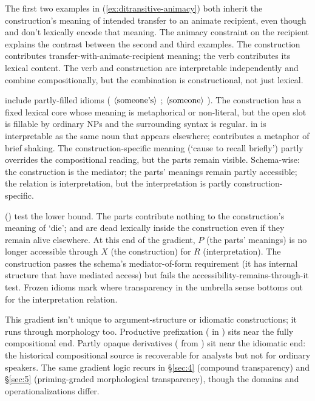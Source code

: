 The first two examples in (\ref{ex:ditransitive-animacy}) both inherit the construction's meaning of intended transfer to an animate recipient, even though  and  don't lexically encode that meaning. The animacy constraint on the recipient explains the contrast between the second and third examples. The construction contributes transfer-with-animate-recipient meaning; the verb contributes its lexical content. The verb and construction are interpretable independently and combine compositionally, but the combination is constructional, not just lexical.

 include partly-filled idioms ( \(\langle\textup{someone's}\rangle\) ;  \(\langle\textup{someone}\rangle\) ). The construction has a fixed lexical core whose meaning is metaphorical or non-literal, but the open slot is fillable by ordinary NPs and the surrounding syntax is regular.  in  is interpretable as the same noun that appears elsewhere;  contributes a metaphor of brief shaking. The construction-specific meaning (`cause to recall briefly') partly overrides the compositional reading, but the parts remain visible. Schema-wise: the construction is the mediator; the parts' meanings remain partly accessible; the relation is interpretation, but the interpretation is partly construction-specific.

 () test the lower bound. The parts contribute nothing to the construction's meaning of `die';  and  are dead lexically inside the construction even if they remain alive elsewhere. At this end of the gradient, $P$ (the parts' meanings) is no longer accessible through $X$ (the construction) for $R$ (interpretation). The construction passes the schema's mediator-of-form requirement (it has internal structure that  have mediated access) but fails the accessibility-remains-through-it test. Frozen idioms mark where transparency in the umbrella sense bottoms out for the interpretation relation.

This gradient isn't unique to argument-structure or idiomatic constructions; it runs through morphology too. Productive prefixation ( in ) sits near the fully compositional end. Partly opaque derivatives ( from ) sit near the idiomatic end: the historical compositional source is recoverable for analysts but not for ordinary speakers. The same gradient logic recurs in §\ref{sec:4} (compound transparency) and §\ref{sec:5} (priming-graded morphological transparency), though the domains and operationalizations differ.

